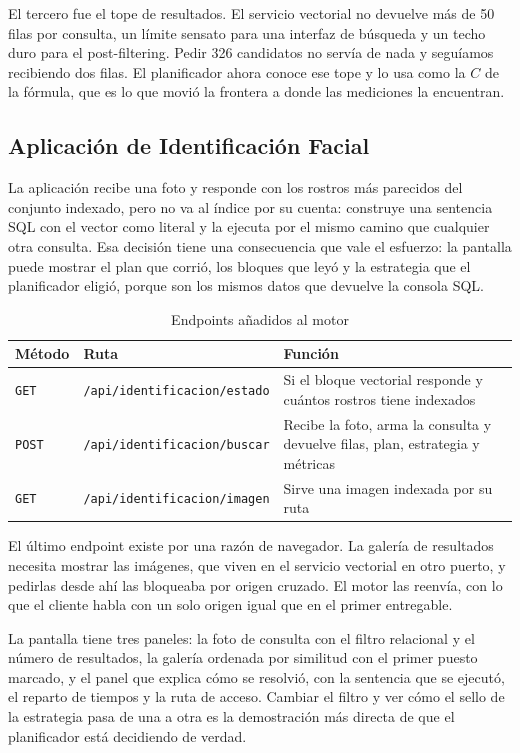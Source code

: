 \documentclass[a4paper,12pt]{article}
\begin{document}
El tercero fue el tope de resultados. El servicio vectorial no devuelve más de
50 filas por consulta, un límite sensato para una interfaz de búsqueda y un techo
duro para el post-filtering. Pedir 326 candidatos no servía de nada y seguíamos
recibiendo dos filas. El planificador ahora conoce ese tope y lo usa como la $C$
de la fórmula, que es lo que movió la frontera a donde las mediciones la
encuentran.

\subsection{Aplicación de Identificación Facial}

La aplicación recibe una foto y responde con los rostros más parecidos del
conjunto indexado, pero no va al índice por su cuenta: construye una sentencia
SQL con el vector como literal y la ejecuta por el mismo camino que cualquier
otra consulta. Esa decisión tiene una consecuencia que vale el esfuerzo: la
pantalla puede mostrar el plan que corrió, los bloques que leyó y la estrategia
que el planificador eligió, porque son los mismos datos que devuelve la consola
SQL.

\begin{table}[H]
\centering
\caption{Endpoints añadidos al motor}
\begin{tabularx}{\textwidth}{@{}llX@{}}
\toprule
\textbf{Método} & \textbf{Ruta} & \textbf{Función} \\
\midrule
\texttt{GET} & \texttt{/api/identificacion/estado} & Si el bloque vectorial
responde y cuántos rostros tiene indexados \\
\texttt{POST} & \texttt{/api/identificacion/buscar} & Recibe la foto, arma la
consulta y devuelve filas, plan, estrategia y métricas \\
\texttt{GET} & \texttt{/api/identificacion/imagen} & Sirve una imagen indexada
por su ruta \\
\bottomrule
\end{tabularx}
\end{table}

El último endpoint existe por una razón de navegador. La galería de resultados
necesita mostrar las imágenes, que viven en el servicio vectorial en otro
puerto, y pedirlas desde ahí las bloqueaba por origen cruzado. El motor las
reenvía, con lo que el cliente habla con un solo origen igual que en el primer
entregable.

La pantalla tiene tres paneles: la foto de consulta con el filtro relacional y el
número de resultados, la galería ordenada por similitud con el primer puesto
marcado, y el panel que explica cómo se resolvió, con la sentencia que se
ejecutó, el reparto de tiempos y la ruta de acceso. Cambiar el filtro y ver cómo
el sello de la estrategia pasa de una a otra es la demostración más directa de
que el planificador está decidiendo de verdad.
\end{document}
